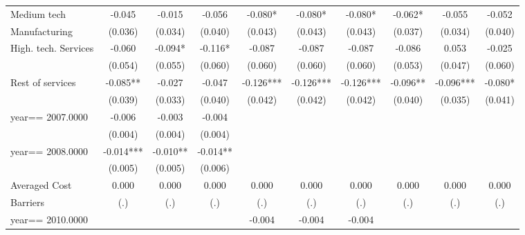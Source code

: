 \begin{table}[htbp]
\begin{tabular}{l*{9}{c}}
Medium tech         &      -0.045   &      -0.015   &      -0.056   &      -0.080*  &      -0.080*  &      -0.080*  &      -0.062*  &      -0.055   &      -0.052   \\
Manufacturing       &     (0.036)   &     (0.034)   &     (0.040)   &     (0.043)   &     (0.043)   &     (0.043)   &     (0.037)   &     (0.034)   &     (0.040)   \\
High. tech. Services&      -0.060   &      -0.094*  &      -0.116*  &      -0.087   &      -0.087   &      -0.087   &      -0.086   &       0.053   &      -0.025   \\
                    &     (0.054)   &     (0.055)   &     (0.060)   &     (0.060)   &     (0.060)   &     (0.060)   &     (0.053)   &     (0.047)   &     (0.060)   \\
Rest of services    &      -0.085** &      -0.027   &      -0.047   &      -0.126***&      -0.126***&      -0.126***&      -0.096** &      -0.096***&      -0.080*  \\
                    &     (0.039)   &     (0.033)   &     (0.040)   &     (0.042)   &     (0.042)   &     (0.042)   &     (0.040)   &     (0.035)   &     (0.041)   \\
year==  2007.0000   &      -0.006   &      -0.003   &      -0.004   &               &               &               &               &               &               \\
                    &     (0.004)   &     (0.004)   &     (0.004)   &               &               &               &               &               &               \\
year==  2008.0000   &      -0.014***&      -0.010** &      -0.014** &               &               &               &               &               &               \\
                    &     (0.005)   &     (0.005)   &     (0.006)   &               &               &               &               &               &               \\
Averaged Cost       &       0.000   &       0.000   &       0.000   &       0.000   &       0.000   &       0.000   &       0.000   &       0.000   &       0.000   \\
Barriers            &         (.)   &         (.)   &         (.)   &         (.)   &         (.)   &         (.)   &         (.)   &         (.)   &         (.)   \\
year==  2010.0000   &               &               &               &      -0.004   &      -0.004   &      -0.004   &               &               &               \\

\end{tabular}
\end{table}
